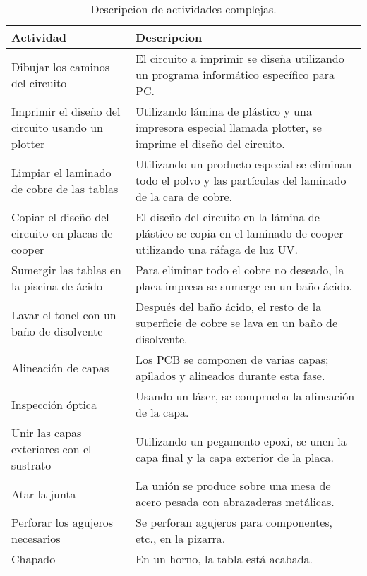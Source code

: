 \documentclass[a4paper]{article}
\begin{document}

\begin{table}[t]
\caption{\label{tab:tabla ejemplo}Descripcion de actividades complejas.}
\begin{center}
\begin{tabular}{ | m{2cm} | m{5cm} | }
\hline Actividad & Descripcion \\ \hline
Dibujar los caminos del circuito & El circuito a imprimir se diseña utilizando un programa informático específico para PC. \\ \hline
Imprimir el diseño del circuito usando un plotter & Utilizando lámina de plástico y una impresora especial llamada plotter, se imprime el diseño del circuito. \\ \hline
Limpiar el laminado de cobre de las tablas & Utilizando un producto especial se eliminan todo el polvo y las partículas del laminado de la cara de cobre. \\ \hline
Copiar el diseño del circuito en placas de cooper & El diseño del circuito en la lámina de plástico se copia en el laminado de cooper utilizando una ráfaga de luz UV.\\ \hline
Sumergir las tablas en la piscina de ácido & Para eliminar todo el cobre no deseado, la placa impresa se sumerge en un baño ácido.\\ \hline
Lavar el tonel con un baño de disolvente & Después del baño ácido, el resto de la superficie de cobre se lava en un baño de disolvente.\\ \hline
Alineación de capas & Los PCB se componen de varias capas; apilados y alineados durante esta fase.\\ \hline
Inspección óptica & Usando un láser, se comprueba la alineación de la capa.\\ \hline
Unir las capas exteriores con el sustrato & Utilizando un pegamento epoxi, se unen la capa final y la capa exterior de la placa.\\ \hline
Atar la junta & La unión se produce sobre una mesa de acero pesada con abrazaderas metálicas.\\ \hline
Perforar los agujeros necesarios & Se perforan agujeros para componentes, etc., en la pizarra.\\ \hline
Chapado & En un horno, la tabla está acabada.\\ \hline

\end{tabular}
\end{center}
\end{table}
\end{document}
